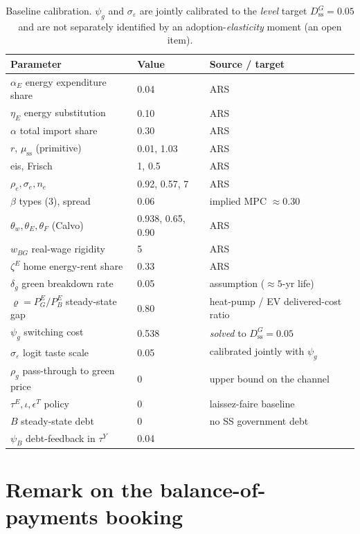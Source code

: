 \documentclass[11pt]{article}
\newcommand{\stst}{\mathrm{ss}}
\newcommand{\DG}{D^{G}}
\newcommand{\PEB}{P^{E}_{B}}
\newcommand{\PEG}{P^{E}_{G}}
\begin{document}
\begin{table}[h]\centering\small
\begin{tabular}{lll}
\toprule
Parameter & Value & Source / target\\
\midrule
$\alpha_E$ energy expenditure share & 0.04 & ARS\\
$\eta_E$ energy substitution & 0.10 & ARS\\
$\alpha$ total import share & 0.30 & ARS\\
$r$, $\mu_{\stst}$ (primitive) & 0.01, 1.03 & ARS\\
eis, Frisch & 1, 0.5 & ARS\\
$\rho_e,\sigma_e,n_e$ & 0.92, 0.57, 7 & ARS\\
$\beta$ types (3), spread & 0.06 & implied MPC $\approx 0.30$\\
$\theta_w,\theta_E,\theta_F$ (Calvo) & 0.938, 0.65, 0.90 & ARS\\
$w_{BG}$ real-wage rigidity & 5 & ARS\\
$\zeta^{E}$ home energy-rent share & 0.33 & ARS\\
\midrule
$\delta_g$ green breakdown rate & 0.05 & assumption ($\approx 5$-yr life)\\
$\varrho=\PEG/\PEB$ steady-state gap & 0.80 & heat-pump / EV delivered-cost ratio\\
$\psi_g$ switching cost & 0.538 & \emph{solved} to $\DG_{\stst}=0.05$\\
$\sigma_\varepsilon$ logit taste scale & 0.05 & calibrated jointly with $\psi_g$\\
$\rho_g$ pass-through to green price & 0 & upper bound on the channel\\
\midrule
$\tau^{E},\iota,\epsilon^{T}$ policy & 0 & laissez-faire baseline\\
$B$ steady-state debt & 0 & no SS government debt\\
$\psi_B$ debt-feedback in $\tau^{Y}$ & 0.04 & \\
\bottomrule
\end{tabular}
\caption{Baseline calibration. $\psi_g$ and $\sigma_\varepsilon$ are jointly
calibrated to the \emph{level} target $\DG_{\stst}=0.05$ and are not separately
identified by an adoption-\emph{elasticity} moment (an open item).}
\end{table}

\section{Remark on the balance-of-payments booking}\label{sec:remarks}
\end{document}
